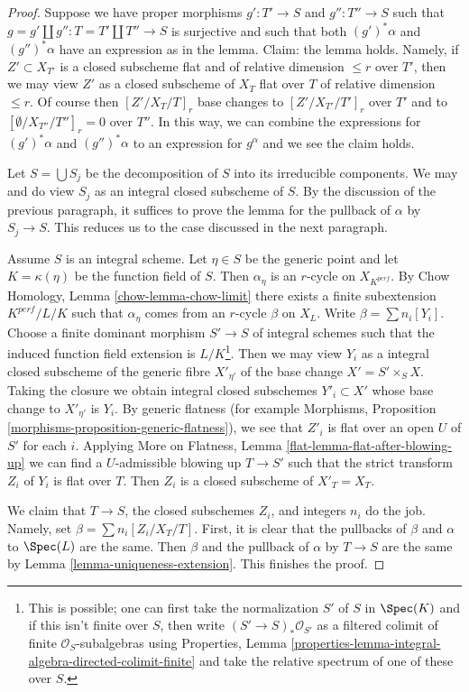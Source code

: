 \begin{proof}
Suppose we have proper morphisms $g' : T' \to S$ and $g'' : T'' \to S$
such that $g  = g' \amalg g'' : T = T' \amalg T'' \to S$
is surjective and such that both $(g')^*\alpha$ and $(g'')^*\alpha$
have an expression as in the lemma. Claim: the lemma holds.
Namely, if $Z' \subset X_{T'}$ is a closed subscheme flat and of relative
dimension $\leq r$ over $T'$, then we may view $Z'$ as a closed subscheme
of $X_T$ flat over $T$ of relative dimension $\leq r$. Of course
then $[Z'/X_T/T]_r$ base changes to $[Z'/X_{T'}/T']_r$ over $T'$
and to $[\emptyset/X_{T''}/T'']_r = 0$ over $T''$. In this way,
we can combine the expressions for $(g')^*\alpha$ and $(g'')^*\alpha$
to an expression for $g^\alpha$ and we see the claim holds.

\medskip\noindent
Let $S = \bigcup S_j$ be the decomposition of $S$ into its irreducible
components. We may and do view $S_j$ as an integral closed subscheme of $S$.
By the discussion of the previous paragraph, it suffices to prove
the lemma for the pullback of $\alpha$ by $S_j \to S$. This reduces us
to the case discussed in the next paragraph.

\medskip\noindent
Assume $S$ is an integral scheme. Let $\eta \in S$ be the generic point
and let $K = \kappa(\eta)$ be the function field of $S$.
Then $\alpha_\eta$ is an $r$-cycle on $X_{K^{perf}}$.
By Chow Homology, Lemma \ref{chow-lemma-chow-limit}
there exists a finite subextension
$K^{perf}/L/K$ such that $\alpha_\eta$ comes from an $r$-cycle
$\beta$ on $X_L$. Write $\beta = \sum n_i[Y_i]$.
Choose a finite dominant morphism $S' \to S$ of integral schemes
such that the induced function field extension is $L/K$\footnote{This is
possible; one can first take the normalization $S'$ of $S$ in $\Spec(K)$
and if this isn't finite over $S$, then write $(S' \to S)_*\mathcal{O}_{S'}$
as a filtered colimit of finite $\mathcal{O}_S$-subalgebras using
Properties, Lemma
\ref{properties-lemma-integral-algebra-directed-colimit-finite}
and take the relative spectrum of one of these over $S$.}.
Then we may view $Y_i$ as a integral closed subscheme of the
generic fibre $X'_{\eta'}$ of the base change $X' = S' \times_S X$.
Taking the closure we obtain integral closed subschemes
$Y'_i \subset X'$ whose base change to $X'_{\eta'}$ is $Y_i$.
By generic flatness (for example Morphisms,
Proposition \ref{morphisms-proposition-generic-flatness}),
we see that $Z'_i$ is flat over an open $U$ of $S'$ for each $i$.
Applying More on Flatness, Lemma \ref{flat-lemma-flat-after-blowing-up}
we can find a $U$-admissible blowing up $T \to S'$
such that the strict transform $Z_i$ of $Y_i$ is flat over $T$.
Then $Z_i$ is a closed subscheme of $X'_T = X_T$.

\medskip\noindent
We claim that $T \to S$, the closed subschemes $Z_i$, and integers
$n_i$ do the job. Namely, set $\beta = \sum n_i[Z_i/X_T/T]$.
First, it is clear that the pullbacks of $\beta$ and $\alpha$
to $\Spec(L)$ are the same. Then $\beta$ and the pullback of
$\alpha$ by $T \to S$ are the same by Lemma \ref{lemma-uniqueness-extension}.
This finishes the proof.
\end{proof}















